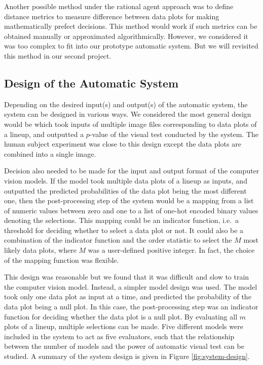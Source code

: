 \documentclass{monashthesis}
\theoremstyle{definition}
\theoremstyle{definition}
\theoremstyle{definition}
\theoremstyle{definition}
\theoremstyle{remark}
\begin{document}
Another possible method under the rational agent approach was to define distance metrics to measure difference between data plots for making mathematically prefect decisions. This method would work if such metrics can be obtained manually or approximated algorithmically. However, we considered it was too complex to fit into our prototype automatic system. But we will revisited this method in our second project.

\hypertarget{design-of-the-automatic-system}{%
\subsection{Design of the Automatic System}\label{design-of-the-automatic-system}}

Depending on the desired input(s) and output(s) of the automatic system, the system can be designed in various ways. We considered the most general design would be which took inputs of multiple image files corresponding to data plots of a lineup, and outputted a \(p\)-value of the visual test conducted by the system. The human subject experiment was close to this design except the data plots are combined into a single image.

Decision also needed to be made for the input and output format of the computer vision models. If the model took multiple data plots of a lineup as inputs, and outputted the predicted probabilities of the data plot being the most different one, then the post-processing step of the system would be a mapping from a list of numeric values between zero and one to a list of one-hot encoded binary values denoting the selections. This mapping could be an indicator function, i.e.~a threshold for deciding whether to select a data plot or not. It could also be a combination of the indicator function and the order statistic to select the \(M\) most likely data plots, where \(M\) was a user-defined positive integer. In fact, the choice of the mapping function was flexible.

This design was reasonable but we found that it was difficult and slow to train the computer vision model. Instead, a simpler model design was used. The model took only one data plot as input at a time, and predicted the probability of the data plot being a null plot. In this case, the post-processing step was an indicator function for deciding whether the data plot is a null plot. By evaluating all \(m\) plots of a lineup, multiple selections can be made. Five different models were included in the system to act as five evaluators, such that the relationship between the number of models and the power of automatic visual test can be studied. A summary of the system design is given in Figure \ref{fig:system-design}.
\end{document}
